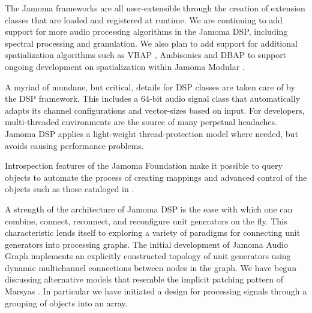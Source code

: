\documentclass[twoside,10pt]{article}
\begin{document}
The Jamoma frameworks are all user-extensible through the creation of extension classes that are loaded and registered at runtime.  We are continuing to add support for more audio processing algorithms in the Jamoma DSP, including spectral processing and granulation. We also plan to add support for additional spatialization algorithms such as VBAP \cite{Pulkki:1997vbap}, Ambisonics \cite{Gerzon:1974surround, Poletti:2000holographic_sound} and DBAP \cite{Lossius:2009} to support ongoing development on spatialization within Jamoma Modular \cite{Peters:2009}.


A myriad of mundane, but critical, details for DSP classes are taken care of by the DSP framework.  This includes a 64-bit audio signal class that automatically adapts its channel configurations and vector-sizes based on input.  For developers, multi-threaded environments are the source of many perpetual headaches.  Jamoma DSP applies a light-weight thread-protection model where needed, but avoids causing performance problems.  %


Introspection features of the Jamoma Foundation make it possible to query objects to automate the process of creating mappings and advanced control of the objects such as those cataloged in \cite{Pendharkar:2006}.

A strength of the architecture of Jamoma DSP is the ease with which one can combine, connect, reconnect, and reconfigure unit generators on the fly.  This characteristic lends itself to exploring a variety of paradigms for connecting unit generators into processing graphs.  The initial development of Jamoma Audio Graph implements an explicitly constructed topology of unit generators using dynamic multichannel connections between nodes in the graph.  We have begun discussing alternative models that resemble the implicit patching pattern of Marsyas \cite{Bray:2005}.  In particular we have initiated a design for processing signals through a grouping of objects into an array.
\end{document}
